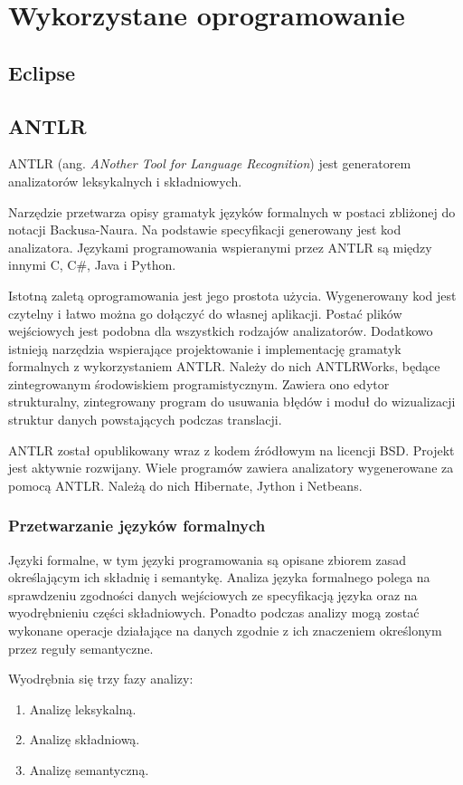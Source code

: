 \chapter{Wykorzystane oprogramowanie}
\section{Eclipse}

\section{ANTLR}
ANTLR (ang. \emph{ANother Tool for Language Recognition}) jest generatorem
analizatorów leksykalnych i składniowych.

Narzędzie przetwarza opisy gramatyk języków formalnych w postaci 
zbliżonej do notacji
 Backusa-Naura. Na podstawie specyfikacji generowany jest kod analizatora.
Językami programowania wspieranymi przez ANTLR są między innymi C, C\#, Java
i Python.

Istotną zaletą oprogramowania jest jego prostota użycia. Wygenerowany kod 
jest czytelny i łatwo można go dołączyć do własnej aplikacji. Postać plików
wejściowych jest podobna dla wszystkich rodzajów analizatorów. Dodatkowo
istnieją narzędzia wspierające projektowanie i implementację gramatyk
formalnych z wykorzystaniem ANTLR. Należy do nich ANTLRWorks, będące
zintegrowanym środowiskiem programistycznym. Zawiera ono edytor strukturalny,
zintegrowany program do usuwania błędów i moduł do wizualizacji struktur 
danych powstających podczas translacji.

ANTLR został opublikowany wraz z kodem źródłowym na licencji BSD. Projekt jest
aktywnie rozwijany. Wiele programów zawiera analizatory wygenerowane za pomocą
ANTLR. Należą do nich Hibernate, Jython i Netbeans.

\subsection{Przetwarzanie języków formalnych}
Języki formalne, w tym języki programowania są opisane zbiorem zasad określającym
ich składnię i semantykę. Analiza języka formalnego polega na sprawdzeniu zgodności
danych wejściowych ze specyfikacją języka oraz na wyodrębnieniu części składniowych.
Ponadto podczas analizy mogą zostać wykonane operacje działające na danych zgodnie
z ich znaczeniem określonym przez reguły semantyczne.

Wyodrębnia się trzy fazy analizy:
\begin{enumerate}
\item Analizę leksykalną.
\item Analizę składniową.
\item Analizę semantyczną.
\end{enumerate}

